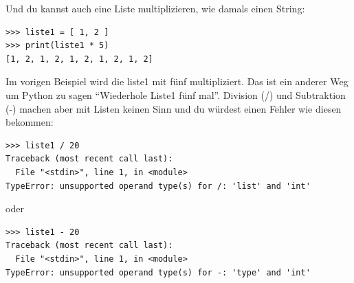 \noindent
Und du kannst auch eine Liste multiplizieren, wie damals einen String:

\begin{Verbatim}[frame=single]
>>> liste1 = [ 1, 2 ]
>>> print(liste1 * 5)
[1, 2, 1, 2, 1, 2, 1, 2, 1, 2]
\end{Verbatim}

\noindent
Im vorigen Beispiel wird die liste1 mit fünf multipliziert. Das ist ein anderer Weg um Python zu sagen ``Wiederhole Liste1 fünf mal''. Division (/) und Subtraktion (-) machen aber mit Listen keinen Sinn und du würdest einen Fehler wie diesen bekommen:

\begin{Verbatim}[frame=single]
>>> liste1 / 20
Traceback (most recent call last):
  File "<stdin>", line 1, in <module>
TypeError: unsupported operand type(s) for /: 'list' and 'int'
\end{Verbatim}

\noindent
oder

\begin{Verbatim}[frame=single]
>>> liste1 - 20
Traceback (most recent call last):
  File "<stdin>", line 1, in <module>
TypeError: unsupported operand type(s) for -: 'type' and 'int'
\end{Verbatim}

